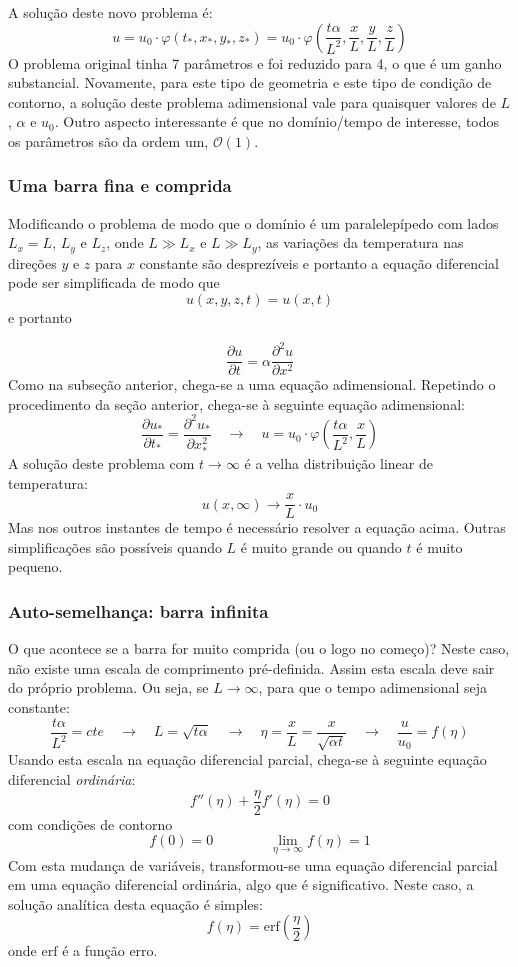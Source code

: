 \documentclass[article,12pt,oneside,a4paper,english,brazil,sumario=tradicional]{abntex2}
\newcommand{\lra}{\ensuremath{\longrightarrow}}
\newcommand{\qrq}{\ensuremath{\quad\lra\quad}}
\newcommand{\pd}{\ensuremath{\partial}}
\begin{document}
A solução deste novo problema é:
\[
u = u_0 \cdot \varphi(t_*, x_*, y_*, z_*) = u_0\cdot\varphi\left(\frac{t\alpha}{L^2}, \frac{x}{L}, 
 \frac{y}{L} , \frac{z}{L}\right)
\]
O problema original tinha 7 parâmetros e foi reduzido para 4, o que é um ganho substancial. Novamente, para este tipo de geometria e este tipo de condição de contorno, a solução deste problema adimensional vale para quaisquer valores de $L$, $\alpha$ e $u_0$. Outro aspecto interessante é que no domínio/tempo de interesse, todos os parâmetros são da ordem um, $\mathcal{O}(1)$.

\subsubsection{Uma barra fina e comprida}

Modificando o problema de modo que o domínio é um paralelepípedo com lados $L_x=L$, $L_y$ e $L_z$, onde $L \gg L_x$ e $L \gg L_y$, as variações da temperatura nas direções $y$ e $z$ para $x$ constante são desprezíveis e portanto a equação diferencial pode ser simplificada de modo que 
\[
u(x, y, z, t) = u(x, t)
\]
e portanto

\[
\frac{\pd u}{\pd t} = \alpha \frac{\pd^2 u}{\pd x^2}
\]
Como na subseção anterior, chega-se a uma equação adimensional. Repetindo o procedimento da seção anterior, chega-se à seguinte equação adimensional:
\[
\frac{\pd u_*}{\pd t_*} = \frac{\pd^2 u_*}{\pd x_*^2} \qrq u = u_0\cdot\varphi\left(\frac{t\alpha}{L^2}, \frac{x}{L}\right)
\]
A solução deste problema com $t\lra\infty$ é a velha distribuição linear de temperatura:
\[
u(x,\infty) \lra \frac{x}{L}\cdot u_0
\]
Mas nos outros instantes de tempo é necessário resolver a equação acima. Outras simplificações são possíveis quando $L$ é muito grande ou quando $t$ é muito pequeno.

\subsubsection{Auto-semelhança: barra infinita}
O que acontece se a barra for muito comprida (ou o logo no começo)? Neste caso, não existe uma escala de comprimento pré-definida. Assim esta escala deve sair do próprio problema. Ou seja, se $L\lra\infty$, para que o tempo adimensional seja constante:
\[
\frac{t\alpha}{L^2} = cte \qrq L = \sqrt{t\alpha} \qrq \eta = \frac{x}{L} = \frac{x}{\sqrt{\alpha t}} \qrq \frac{u}{u_0} = f(\eta)
\]
Usando esta escala na equação diferencial parcial, chega-se à seguinte equação diferencial \emph{ordinária}:
\[
f''(\eta) + \frac{\eta}{2} f'(\eta) = 0
\]
com condições de contorno
\[
f(0) = 0 \qquad\qquad \lim_{\eta\lra\infty} f(\eta) = 1
\]
Com esta mudança de variáveis, transformou-se uma equação diferencial parcial em uma equação diferencial ordinária, algo que é significativo. Neste caso, a solução analítica desta equação é simples:
\[
f(\eta) = \mathrm{erf}\left(\frac{\eta}{2}\right)
\]
onde $\mathrm{erf}$ é a função erro.
\end{document}
